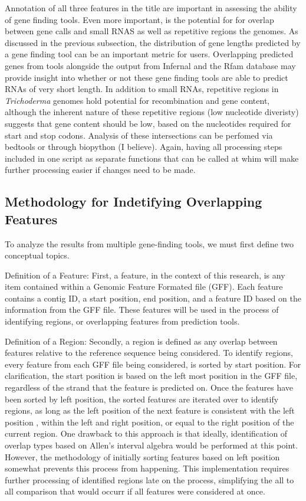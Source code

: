 Annotation of all three features in the title are important in
assessing the ability of gene finding tools. Even more important, is
the potential for for overlap between gene calls and small RNAS as
well as repetitive regions the genomes. As discussed in the previous
subsection, the distribution of gene lengths predicted by a gene
finding tool can be an important metric for users. Overlapping
predicted genes from tools alongside the output from Infernal and the
Rfam database may provide insight into whether or not these gene
finding tools are able to predict RNAs of very short length. In
addition to small RNAs, repetitive regions in \textit{Trichoderma}
genomes hold potential for recombination and gene content, although
the inherent nature of these repetitive regions (low nucleotide
diveristy) suggests that gene content should be low, based on the
nucleotides required for start and stop codons. Analysis of these
intersections can be perfomed via bedtools or through biopython (I
believe). Again, having all processing steps included in one script as
separate functions that can be called at whim will make further
processing easier if changes need to be made.

\subsection{Methodology for Indetifying Overlapping Features}

To analyze the results from multiple gene-finding tools, we must first
define two conceptual topics.

Definition of a Feature: First, a feature, in the context of this
research, is any item contained within a Genomic Feature Formated file
(GFF). Each feature contains a contig ID, a start position, end
position, and a feature ID based on the information from the GFF
file. These features will be used in the process of identifying
regions, or overlapping features from prediction tools.

Definition of a Region: Secondly, a region is defined as any overlap
between features relative to the reference sequence being
considered. To identify regions, every feature from each GFF file
being considered, is sorted by start position. For clarification, the
start position is based on the left most position in the GFF file,
regardless of the strand that the feature is predicted on. Once the
features have been sorted by left position, the sorted features are
iterated over to identify regions, as long as the left position of the
next feature is consistent with the left position , within the left
and right position, or equal to the right position of the current
region. One drawback to this approach is that ideally, identification
of overlap types based on Allen's interval algebra would be performed
at this point. However, the methodology of initially sorting features
based on left position somewhat prevents this process from
happening. This implementation requires further processing of
identified regions late on the process, simplifying the all to all
comparison that would occurr if all features were considered at once.

